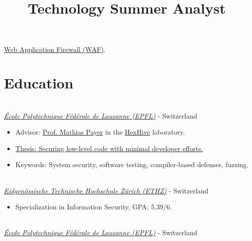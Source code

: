 \documentclass[mm, 11pt]{simple_style}
\begin{document}
\begin{resume}
\begin{position}
{        \href{https://www.airlock.com/en/products/airlock-waf/}{Web Application
        Firewall (WAF)}.
    }
\end{position}
\begin{position}
    \title{Technology Summer Analyst}
\end{position}
\vspace{-\parskip}
\sectionline
\section{Education}

\\
\textsl{\href{https://ic.epfl.ch/en}{\'Ecole Polytechnique F\'ed\'erale de Lausanne (EPFL)}} - Switzerland
\begin{itemize}
  \item Advisor: \href{https://nebelwelt.net/}{Prof. Mathias Payer} in the \href{https://hexhive.epfl.ch}{HexHive} laboratory.
  \item \href{https://infoscience.epfl.ch/entities/publication/5c91711a-5bf2-4fe0-b04e-830ac3a13bfb}{Thesis: Securing low-level code with minimal developer efforts.}
  \item Keywords: System security, software testing, compiler-based defenses, fuzzing. 
\end{itemize}


\\
\textsl{\href{https://www.inf.ethz.ch/}{Eidgen\"ossische Technische Hochschule Z\"urich (ETHZ)}} - Switzerland

\begin{itemize}
  \item  Specialization in Information Security, GPA: 5.39/6.
\end{itemize}
\\
\textsl{\href{https://ic.epfl.ch/en}{\'Ecole Polytechnique F\'ed\'erale de Lausanne (EPFL)}} - Switzerland


\end{resume}
\end{document}
